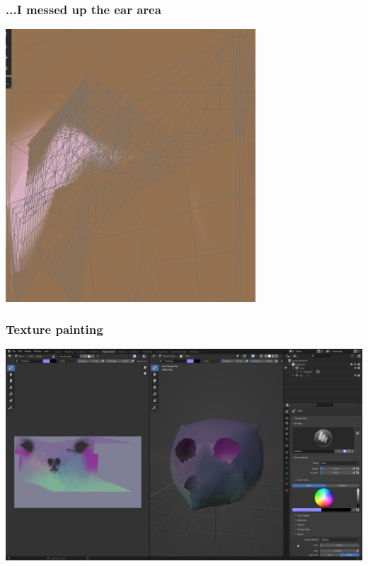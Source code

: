 \documentclass[12pt]{beamer}
\begin{document}
    \begin{frame}
        \frametitle{ ...I messed up the ear area}
        \includegraphics[width=0.7\textwidth]{overlapUVs}
    \end{frame}
    \begin{frame}
        \frametitle{ Texture painting}
        \includegraphics[width=\textwidth]{texturepaint2}
    \end{frame}
\end{document}
